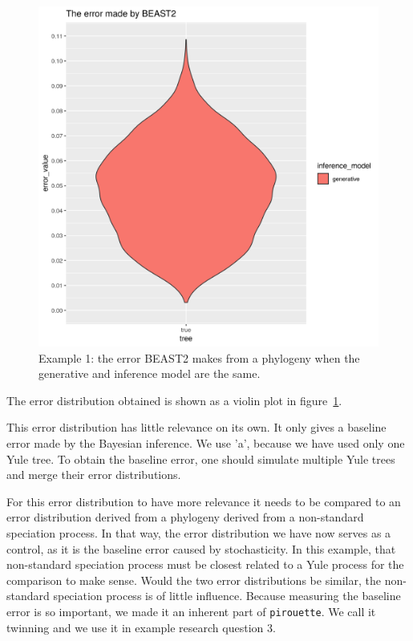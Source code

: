 \documentclass{article}
\begin{document}
\begin{figure}[ht]
  \includegraphics[width=\textwidth]{example_1_errors.png}
  \caption{
    Example 1: the error BEAST2 makes from a phylogeny 
    when the generative and inference model are the same.
  }
  \label{fig:example_1}
\end{figure}

The error distribution obtained is shown as a violin plot
in figure~\ref{fig:example_1}. 

This error distribution has little relevance on its own. 
It only gives a baseline error made by
the Bayesian inference. We use 'a', because we have used only one Yule
tree. To obtain the baseline error, one should simulate multiple Yule
trees and merge their error distributions.

For this error distribution to have more relevance it needs to be compared
to an error distribution derived from a phylogeny 
derived from a non-standard speciation process.
In that way, the error distribution we have now serves as a control,
as it is the baseline error caused by stochasticity.
In this example, that non-standard speciation process must 
be closest related to a Yule process for the comparison to make sense.
Would the two error distributions be similar, the non-standard speciation 
process is of little influence.
Because measuring the baseline error is so important,
we made it an inherent part of \verb;pirouette;. 
We call it twinning and we use it in example research question 3.
\end{document}
